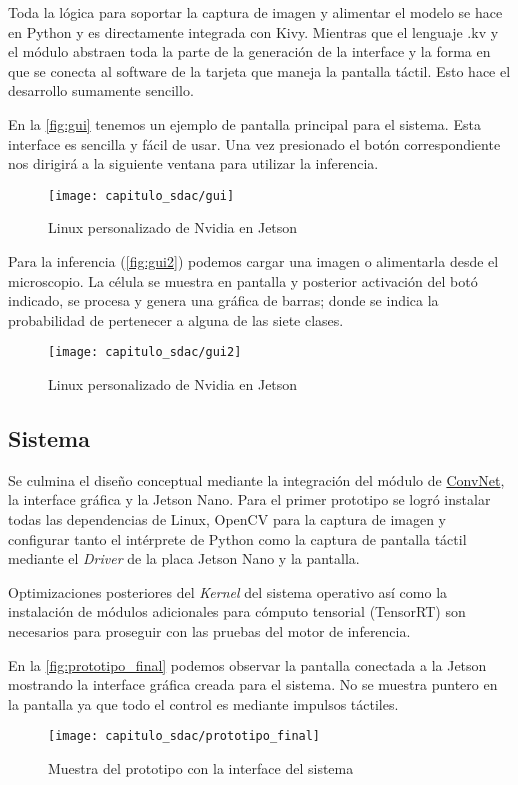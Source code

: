 Toda la lógica para soportar la captura de imagen y alimentar el modelo se hace
en Python y es directamente integrada con Kivy. Mientras que el lenguaje .kv y
el módulo abstraen toda la parte de la generación de la interface y la forma en
que se conecta al software de la tarjeta que maneja la pantalla táctil. Esto
hace el desarrollo sumamente sencillo.

En la \autoref{fig:gui} tenemos un ejemplo de pantalla principal para el
sistema. Esta interface es sencilla y fácil de usar. Una vez presionado el botón
correspondiente nos dirigirá a la siguiente ventana para utilizar la inferencia.

\begin{figure}[H]
    \centering
    \texttt{[image: capitulo\_sdac/gui]}
    \caption{Linux personalizado de Nvidia en Jetson}\label{fig:gui}
\end{figure}

Para la inferencia (\autoref{fig:gui2}) podemos cargar una imagen o alimentarla
desde el microscopio. La célula se muestra en pantalla y posterior activación
del botó indicado, se procesa y genera una gráfica de barras; donde se indica la
probabilidad de pertenecer a alguna de las siete clases.

\begin{figure}[H]
    \centering
    \texttt{[image: capitulo\_sdac/gui2]}
    \caption{Linux personalizado de Nvidia en Jetson}\label{fig:gui2}
\end{figure}


\subsection{Sistema}

Se culmina el diseño conceptual mediante la integración del módulo de
\hyperlink{abbr}{ConvNet}, la interface gráfica y la Jetson Nano. Para el primer
prototipo se logró instalar todas las dependencias de Linux, OpenCV para la
captura de imagen y configurar tanto el intérprete de Python como la captura de
pantalla táctil mediante el \emph{Driver} de la placa Jetson Nano y la pantalla.

Optimizaciones posteriores del \emph{Kernel} del sistema operativo así como la
instalación de módulos adicionales para cómputo tensorial (TensorRT) son
necesarios para proseguir con las pruebas del motor de inferencia.

En la \autoref{fig:prototipo_final} podemos observar la pantalla conectada a la
Jetson mostrando la interface gráfica creada para el sistema. No se muestra
puntero en la pantalla ya que todo el control es mediante impulsos táctiles.

\begin{figure}[H]
    \centering
    \texttt{[image: capitulo\_sdac/prototipo\_final]}
    \caption{Muestra del prototipo con la interface del sistema}\label{fig:prototipo_final}
\end{figure}
